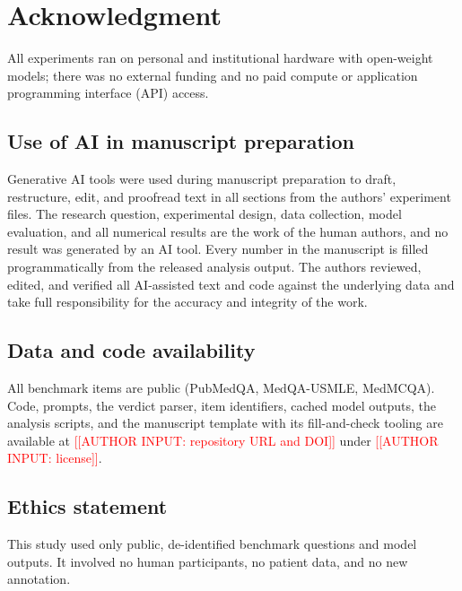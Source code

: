 \documentclass[conference]{IEEEtran}
\newcommand{\ain}[1]{\textcolor{red}{[[AUTHOR INPUT: #1]]}}
\begin{document}
\section*{Acknowledgment}
All experiments ran on personal and institutional hardware with open-weight models; there was no external funding and no paid compute or application programming interface (API) access.

\subsection*{Use of AI in manuscript preparation}
Generative AI tools were used during manuscript preparation to draft, restructure, edit, and proofread text in all sections from the authors' experiment files. The research question, experimental design, data collection, model evaluation, and all numerical results are the work of the human authors, and no result was generated by an AI tool. Every number in the manuscript is filled programmatically from the released analysis output. The authors reviewed, edited, and verified all AI-assisted text and code against the underlying data and take full responsibility for the accuracy and integrity of the work.

\subsection*{Data and code availability}
All benchmark items are public (PubMedQA, MedQA-USMLE, MedMCQA). Code, prompts, the verdict parser, item identifiers, cached model outputs, the analysis scripts, and the manuscript template with its fill-and-check tooling are available at \ain{repository URL and DOI} under \ain{license}.

\subsection*{Ethics statement}
This study used only public, de-identified benchmark questions and model outputs. It involved no human participants, no patient data, and no new annotation.
\end{document}
